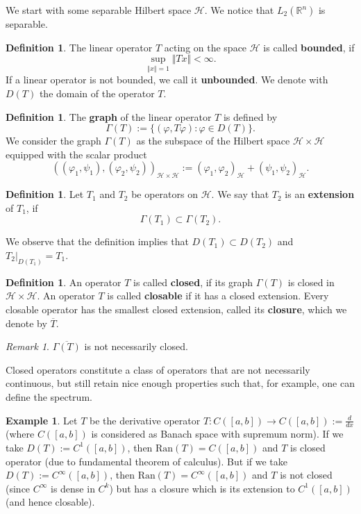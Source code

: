 \documentclass[11pt, a4paper, german]{article}
\theoremstyle{plain}
\theoremstyle{definition}
\newtheorem{definition}[theorem]{Definition}
\newtheorem{example}[theorem]{Example}
\theoremstyle{remark}
\newtheorem{remark}[theorem]{Remark}
\numberwithin{equation}{section}
\numberwithin{theorem}{section}
\begin{document}
We start with some separable Hilbert space $\mathcal{H}$. We notice that $L_2(\mathbb R ^n)$ is separable.

\begin{definition} The linear operator $T$ acting on the space $\mathcal{H}$ is called \textbf{bounded}, if $$\sup_{\Vert x \Vert = 1}  \Vert Tx \Vert < \infty.$$ If a linear operator is not bounded, we call it \textbf{unbounded}. We denote with $D(T)$ the domain of the operator $T$.
\end{definition}

\begin{definition}
The \textbf{graph} of the linear operator $T$ is defined by $$\Gamma(T) := \{(\varphi, T\varphi): \varphi \in D(T)\}.$$ We consider the graph $\Gamma(T)$ as the subspace of the Hilbert space $\mathcal{H}\times \mathcal{H}$ equipped with the scalar product $$((\varphi_1, \psi_1), (\varphi_2, \psi_2))_{\mathcal{H}\times\mathcal{H}} := (\varphi_1, \varphi_2)_{\mathcal{H}} + (\psi_1, \psi_2)_{\mathcal{H}}.$$
\end{definition}

\begin{definition}
Let $T_1$ and $T_2$ be operators on $\mathcal{H}$. We say that $T_2$ is an \textbf{extension} of $T_1$, if $$\Gamma(T_1) \subset \Gamma(T_2).$$
\end{definition}

We observe that the definition implies that $D(T_1)\subset D(T_2)$ and $T_2|_{D(T_1)} = T_1$.

\begin{definition}
An operator $T$ is called \textbf{closed}, if its graph $\Gamma(T)$ is closed in $\mathcal{H}\times\mathcal{H}$. An operator $T$ is called \textbf{closable} if it has a closed extension. Every closable operator has the smallest closed extension, called its \textbf{closure}, which we denote by $\overline{T}$.
\end{definition}

\begin{remark}
$\overline{\Gamma(T)}$ is not necessarily closed.
\end{remark}

Closed operators constitute a class of operators that are not necessarily continuous, but still retain nice enough properties such that, for example, one can define the spectrum.

\begin{example}
Let $T$ be the derivative operator $T : C([a,b]) \rightarrow C([a,b]):= \frac{d}{dx}$ (where $C([a,b])$ is considered as Banach space with supremum norm). If we take $D(T):=C^1([a,b])$, then $\text{Ran}(T)=C([a,b])$ and $T$ is closed operator (due to fundamental theorem of calculus). But if we take $D(T):=C^\infty([a,b])$, then $\text{Ran}(T)=C^\infty([a,b])$ and $T$ is not closed (since $C^\infty$ is dense in $C^k$) but has a closure which is its extension to $C^1([a,b])$ (and hence closable).
\end{example}
\end{document}
